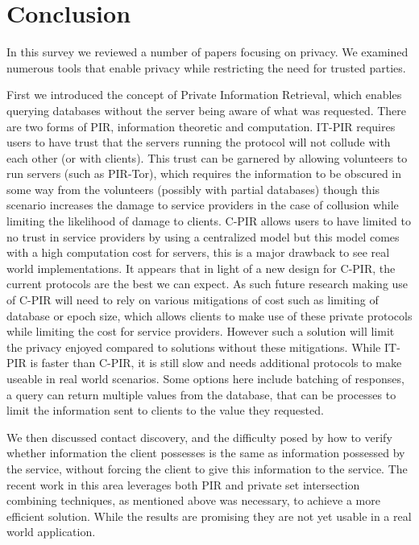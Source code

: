 \section{Conclusion}\label{sec:conclusion}
In this survey we reviewed a number of papers focusing on privacy. We examined
numerous tools that enable privacy while restricting the need for trusted
parties. 

First we introduced the concept of Private Information Retrieval, which enables
querying databases without the server being aware of what was requested. There
are two forms of PIR, information theoretic and computation. IT-PIR requires
users to have trust that the servers running the protocol will not collude with
each other (or with clients). This trust can be garnered by allowing volunteers
to run servers (such as PIR-Tor), which requires the information to be obscured
in some way from the volunteers (possibly with partial databases) though this
scenario increases the damage to service providers in the case of collusion
while limiting the likelihood of damage to clients. C-PIR allows users to have
limited to no trust in service providers by using a centralized model but this
model comes with a high computation cost for servers, this is a major drawback
to see real world implementations. It appears that in light of a new design for
C-PIR, the current protocols are the best we can expect. As such future research
making use of C-PIR will need to rely on various mitigations of cost such as
limiting of database or epoch size, which allows clients to make use of these
private protocols while limiting the cost for service providers. However such a
solution will limit the privacy enjoyed compared to solutions without these
mitigations. While IT-PIR is faster than C-PIR, it is still slow and needs
additional protocols to make useable in real world scenarios. Some options here
include batching of responses, a query can return multiple values from the
database, that can be processes to limit the information sent to clients to the
value they requested.

We then discussed contact discovery, and the difficulty posed by how to verify
whether information the client possesses is the same as information possessed by
the service, without forcing the client to give this information to the service.
The recent work in this area leverages both PIR and private set intersection
combining techniques, as mentioned above was necessary, to achieve a more
efficient solution. While the results are promising they are not yet usable in a
real world application.

